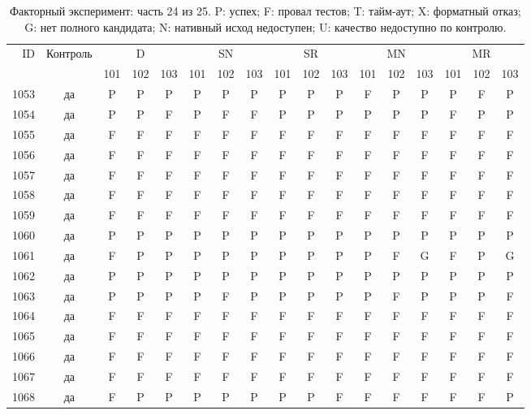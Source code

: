 \begin{table}[p]\centering\footnotesize
\setlength{\tabcolsep}{3pt}
\caption{Факторный эксперимент: часть 24 из 25. P: успех; F: провал тестов; T: тайм-аут; X: форматный отказ; G: нет полного кандидата; N: нативный исход недоступен; U: качество недоступно по контролю.}
\begin{tabular*}{\textwidth}{@{\extracolsep{\fill}}rcccccccccccccccc}\toprule
ID & Контроль & \multicolumn{3}{c}{D} & \multicolumn{3}{c}{SN} & \multicolumn{3}{c}{SR} & \multicolumn{3}{c}{MN} & \multicolumn{3}{c}{MR}\\
\cmidrule(lr){3-5}\cmidrule(lr){6-8}\cmidrule(lr){9-11}\cmidrule(lr){12-14}\cmidrule(lr){15-17}
 & & 101 & 102 & 103 & 101 & 102 & 103 & 101 & 102 & 103 & 101 & 102 & 103 & 101 & 102 & 103\\\midrule
1053 & да & P & P & P & P & P & P & P & P & P & F & P & P & P & F & P\\
1054 & да & P & P & F & P & F & F & P & P & P & P & P & P & F & P & P\\
1055 & да & F & F & F & F & F & F & F & F & F & F & F & F & F & F & F\\
1056 & да & F & F & F & F & F & F & F & F & F & F & F & F & F & F & F\\
1057 & да & F & F & F & F & F & F & F & F & F & F & F & F & F & F & F\\
1058 & да & F & F & F & F & F & F & F & F & F & F & F & F & F & F & F\\
1059 & да & F & F & F & F & F & F & F & F & F & F & F & F & F & F & F\\
1060 & да & P & P & P & P & P & P & P & P & P & P & P & P & P & P & P\\
1061 & да & F & P & P & P & P & P & P & P & P & P & F & G & F & P & G\\
1062 & да & P & P & P & P & P & P & P & P & P & P & P & P & P & P & P\\
1063 & да & P & P & P & P & F & P & P & P & P & P & F & P & P & P & F\\
1064 & да & F & F & F & F & F & F & F & F & F & F & F & F & F & F & F\\
1065 & да & F & F & F & F & F & F & F & F & F & F & F & F & F & F & F\\
1066 & да & F & F & F & F & F & F & F & F & F & F & F & F & F & F & F\\
1067 & да & F & F & F & F & F & F & F & F & F & F & F & F & F & F & F\\
1068 & да & F & P & P & P & P & P & P & P & F & F & F & F & F & F & P\\

\end{tabular*}
\end{table}

